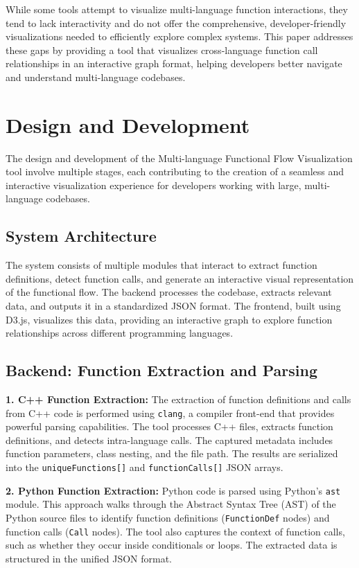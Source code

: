 \documentclass[10pt,twocolumn]{article}
\begin{document}
While some tools attempt to visualize multi-language function interactions, they tend to lack interactivity and do not offer the comprehensive, developer-friendly visualizations needed to efficiently explore complex systems. This paper addresses these gaps by providing a tool that visualizes cross-language function call relationships in an interactive graph format, helping developers better navigate and understand multi-language codebases.
\section{Design and Development}

The design and development of the Multi-language Functional Flow Visualization tool involve multiple stages, each contributing to the creation of a seamless and interactive visualization experience for developers working with large, multi-language codebases.

\subsection{System Architecture}

The system consists of multiple modules that interact to extract function definitions, detect function calls, and generate an interactive visual representation of the functional flow. The backend processes the codebase, extracts relevant data, and outputs it in a standardized JSON format. The frontend, built using D3.js, visualizes this data, providing an interactive graph to explore function relationships across different programming languages.

\subsection{Backend: Function Extraction and Parsing}

\textbf{1. C++ Function Extraction:}  
The extraction of function definitions and calls from C++ code is performed using \texttt{clang}, a compiler front-end that provides powerful parsing capabilities. The tool processes C++ files, extracts function definitions, and detects intra-language calls. The captured metadata includes function parameters, class nesting, and the file path. The results are serialized into the \texttt{uniqueFunctions[]} and \texttt{functionCalls[]} JSON arrays.

\textbf{2. Python Function Extraction:}  
Python code is parsed using Python’s \texttt{ast} module. This approach walks through the Abstract Syntax Tree (AST) of the Python source files to identify function definitions (\texttt{FunctionDef} nodes) and function calls (\texttt{Call} nodes). The tool also captures the context of function calls, such as whether they occur inside conditionals or loops. The extracted data is structured in the unified JSON format.
\end{document}
